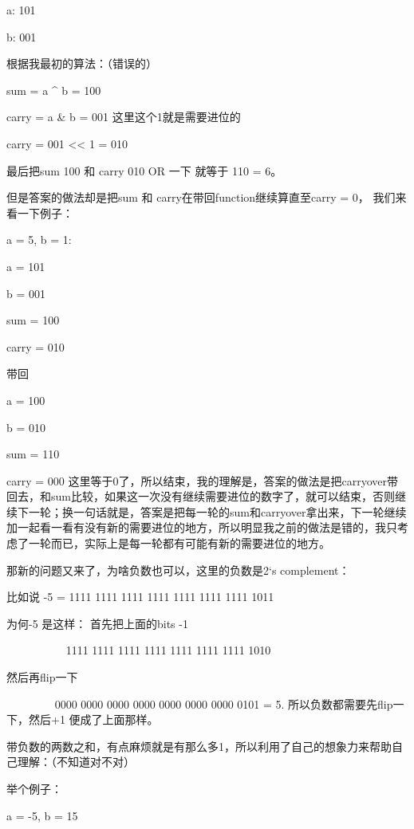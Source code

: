 \documentclass[9pt, b5paper]{article}
\begin{document}
a: 101

b: 001

根据我最初的算法：（错误的）

sum = a \^{} b = 100

carry = a \& b = 001 这里这个1就是需要进位的

carry = 001 << 1 = 010

最后把sum 100 和 carry 010 OR 一下 就等于 110 = 6。

但是答案的做法却是把sum 和 carry在带回function继续算直至carry = 0， 我们来看一下例子：

a = 5, b = 1:

a = 101

b = 001

sum = 100

carry = 010

带回

a = 100

b = 010

sum = 110

carry = 000 这里等于0了，所以结束，我的理解是，答案的做法是把carryover带回去，和sum比较，如果这一次没有继续需要进位的数字了，就可以结束，否则继续下一轮；换一句话就是，答案是把每一轮的sum和carryover拿出来，下一轮继续加一起看一看有没有新的需要进位的地方，所以明显我之前的做法是错的，我只考虑了一轮而已，实际上是每一轮都有可能有新的需要进位的地方。

那新的问题又来了，为啥负数也可以，这里的负数是2‘s complement：

比如说 -5 = 1111 1111 1111 1111 1111 1111 1111 1011

为何-5 是这样： 首先把上面的bits -1

　　　　　 1111 1111 1111 1111 1111 1111 1111 1010

然后再flip一下

　　　　    0000 0000 0000 0000 0000 0000 0000 0101 = 5. 所以负数都需要先flip一下，然后+1 便成了上面那样。

带负数的两数之和，有点麻烦就是有那么多1，所以利用了自己的想象力来帮助自己理解：（不知道对不对）

举个例子：

a = -5, b = 15
\end{document}
